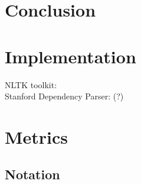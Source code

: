 \documentclass{report}
\theoremstyle{definition}
\theoremstyle{plain}
\begin{document}
\chapter{Conclusion}

%
%



%
%

\appendix
\chapter{Implementation}
\label{appendix:impl}

NLTK toolkit: \cite{bird2009natural}\\
Stanford Dependency Parser: \cite{de2008stanford}(?)

%
%



%
%

\chapter{Metrics}
\label{appendix:metric}

\section{Notation}
\end{document}

